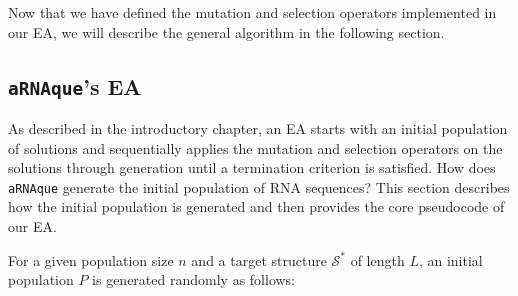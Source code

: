 Now that we have defined the mutation and selection operators implemented in our \ac{EA}, we will describe the general algorithm in the following section.

\subsection{\texttt{aRNAque}'s \ac{EA}}

As described in the introductory chapter, an \ac{EA} starts with an initial population of solutions and sequentially applies the mutation and selection operators on the solutions through generation until a termination criterion is satisfied. How does \texttt{aRNAque} generate the initial population of RNA sequences? This section describes how the initial population is generated and then provides the core pseudocode of our \ac{EA}.

For a given population size $n$ and a target structure $\mathcal{S}^*$ of length $L$, an initial population $P$ is generated randomly as follows: 

